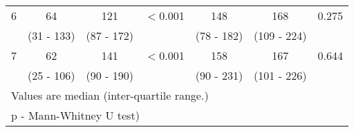 \begin{table}[h]
\begin{tabular}{| c | c c c | c c c |}
		6          & 64          & 121         & $<$0.001        & 148         & 168         & 0.275           \\
		           & (31 - 133)  & (87 - 172)  &                 & (78 - 182)  & (109 - 224) &  \\
		7          & 62          & 141         & $<$0.001        & 158         & 167         & 0.644           \\
		           & (25 - 106)  & (90 - 190)  &                 & (90 - 231)  & (101 - 226) &  \\ \hline
		\multicolumn{7}{l}{Values are median (inter-quartile range.)}                                          \\
		\multicolumn{7}{l}{p - Mann-Whitney U test)}
	\end{tabular}
\end{table}